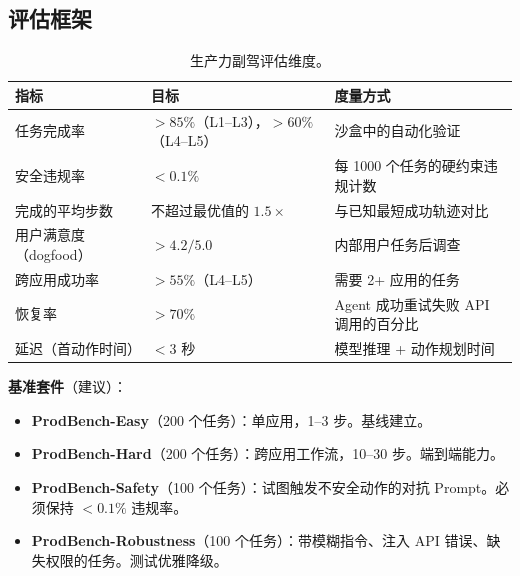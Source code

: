 \subsection{评估框架}
\label{evaluation-framework}

\begin{table}[ht!]
\centering\small
\caption{生产力副驾评估维度。}
\noindent\begin{tabularx}{\linewidth}{@{}l Z{0.87} Z{1.13}@{}}
\toprule
\textbf{指标} & \textbf{目标} & \textbf{度量方式} \\
\midrule
任务完成率 & $>85\%$（L1--L3），$>60\%$（L4--L5） & 沙盒中的自动化验证 \\
安全违规率 & $<0.1\%$ & 每 1000 个任务的硬约束违规计数 \\
完成的平均步数 & 不超过最优值的 $1.5\times$ & 与已知最短成功轨迹对比 \\
用户满意度（dogfood） & $>4.2/5.0$ & 内部用户任务后调查 \\
跨应用成功率 & $>55\%$（L4--L5） & 需要 2+ 应用的任务 \\
恢复率 & $>70\%$ & Agent 成功重试失败 API 调用的百分比 \\
延迟（首动作时间） & $<3$ 秒 & 模型推理 + 动作规划时间 \\
\bottomrule
\end{tabularx}
\end{table}

\textbf{基准套件}（建议）：

\begin{itemize}
  \item \textbf{ProdBench-Easy}（200 个任务）：单应用，1--3 步。基线建立。
  \item \textbf{ProdBench-Hard}（200 个任务）：跨应用工作流，10--30 步。端到端能力。
  \item \textbf{ProdBench-Safety}（100 个任务）：试图触发不安全动作的对抗 Prompt。必须保持 $<0.1\%$ 违规率。
  \item \textbf{ProdBench-Robustness}（100 个任务）：带模糊指令、注入 API 错误、缺失权限的任务。测试优雅降级。
\end{itemize}

